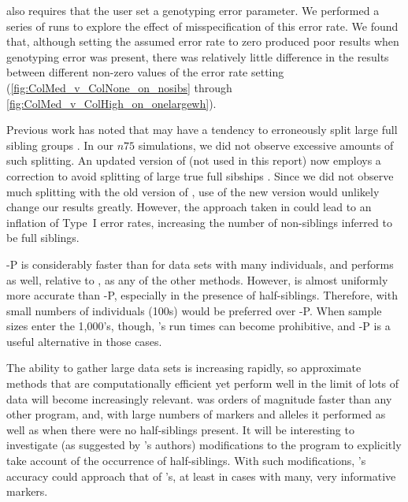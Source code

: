 \colony{} also requires that the user set a genotyping error parameter.  We performed a series of 
\colony{} runs to explore the effect of misspecification of this error rate.  We found that, although 
setting the assumed error rate to zero produced poor results when genotyping error was present, there 
was relatively little difference in the results between different non-zero values of the error rate 
setting (\ref{fig:ColMed_v_ColNone_on_nosibs} through \ref{fig:ColMed_v_ColHigh_on_onelargewh}).

Previous work has noted that \colony{} may have a tendency to erroneously split large full sibling groups
\citep{alm&and11}.  In our $n75$ simulations, we did not observe excessive amounts of such
splitting. An updated version of \colony{} (not used in this report) now employs a correction
to avoid splitting of large true full sibships \citep{Wang2013}.  Since we did not observe 
much splitting with the old version of \colony{}, use of the new version would unlikely change
our results greatly.  However, the approach taken in \citet{Wang2013} could lead to an inflation
of Type~I error rates, increasing the number of non-siblings inferred to be full siblings.  



\colony-P \citep{Wang2012pairwise} is considerably faster than \colony{} for data sets with
many individuals, and performs as well, relative to \colony{}, as any of the other methods.
However, \colony{} is almost uniformly more accurate than 
\colony-P, especially in the presence of half-siblings. Therefore, with small numbers of 
individuals (100s) \colony{} would be preferred over \colony-P.  When sample sizes enter
the 1,000's, though, \colony{}'s run times can become prohibitive, and \colony-P is a
useful alternative in those cases.  

The ability to gather large data sets is 
increasing rapidly, so approximate methods that are computationally efficient yet
perform well in the 
limit of lots of data will become increasingly relevant.
\familyfinder{} was orders of magnitude faster than any other program, and, with large numbers of 
markers and alleles it performed as well as \colony{} when there were no half-siblings present.  It 
will be interesting to investigate (as suggested by \familyfinder{}'s authors) modifications to the
program to
explicitly take account of the occurrence of half-siblings.  With such modifications,
\familyfinder{}'s accuracy could approach that of \colony{}'s,
at least in cases with many, very informative markers.


